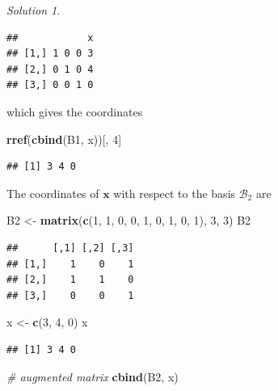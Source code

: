 \documentclass[
]{book}
\newenvironment{Shaded}{\begin{snugshade}}{\end{snugshade}}
\newcommand{\CommentTok}[1]{\textcolor[rgb]{0.56,0.35,0.01}{\textit{#1}}}
\newcommand{\DecValTok}[1]{\textcolor[rgb]{0.00,0.00,0.81}{#1}}
\newcommand{\KeywordTok}[1]{\textcolor[rgb]{0.13,0.29,0.53}{\textbf{#1}}}
\newcommand{\NormalTok}[1]{#1}
\newcommand{\StringTok}[1]{\textcolor[rgb]{0.31,0.60,0.02}{#1}}
\theoremstyle{definition}
\theoremstyle{definition}
\theoremstyle{definition}
\theoremstyle{remark}
\newtheorem*{solution}{Solution}
\begin{document}
\begin{solution}
\begin{verbatim}
##            x
## [1,] 1 0 0 3
## [2,] 0 1 0 4
## [3,] 0 0 1 0
\end{verbatim}

which gives the coordinates

\begin{Shaded}
\begin{Highlighting}[]
\KeywordTok{rref}\NormalTok{(}\KeywordTok{cbind}\NormalTok{(B1, x))[, }\DecValTok{4}\NormalTok{]}
\end{Highlighting}
\end{Shaded}

\begin{verbatim}
## [1] 3 4 0
\end{verbatim}

The coordinates of \(\mathbf{x}\) with respect to the basis \(\mathcal{B}_2\) are

\begin{Shaded}
\begin{Highlighting}[]
\NormalTok{B2 <-}\StringTok{ }\KeywordTok{matrix}\NormalTok{(}\KeywordTok{c}\NormalTok{(}\DecValTok{1}\NormalTok{, }\DecValTok{1}\NormalTok{, }\DecValTok{0}\NormalTok{, }\DecValTok{0}\NormalTok{, }\DecValTok{1}\NormalTok{, }\DecValTok{0}\NormalTok{, }\DecValTok{1}\NormalTok{, }\DecValTok{0}\NormalTok{, }\DecValTok{1}\NormalTok{), }\DecValTok{3}\NormalTok{, }\DecValTok{3}\NormalTok{)}
\NormalTok{B2}
\end{Highlighting}
\end{Shaded}

\begin{verbatim}
##      [,1] [,2] [,3]
## [1,]    1    0    1
## [2,]    1    1    0
## [3,]    0    0    1
\end{verbatim}

\begin{Shaded}
\begin{Highlighting}[]
\NormalTok{x <-}\StringTok{ }\KeywordTok{c}\NormalTok{(}\DecValTok{3}\NormalTok{, }\DecValTok{4}\NormalTok{, }\DecValTok{0}\NormalTok{)}
\NormalTok{x}
\end{Highlighting}
\end{Shaded}

\begin{verbatim}
## [1] 3 4 0
\end{verbatim}

\begin{Shaded}
\begin{Highlighting}[]
\CommentTok{# augmented matrix}
\KeywordTok{cbind}\NormalTok{(B2, x)}
\end{Highlighting}
\end{Shaded}


\end{solution}
\end{document}
